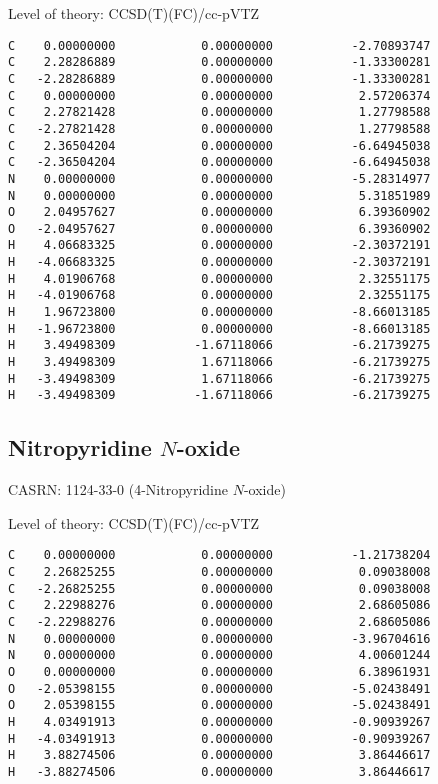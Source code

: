\documentclass[journal=jctcce,manuscript=article,layout=traditional]{achemso}
\newcommand{\TZ}{cc-pVTZ}
\begin{document}
\begin{singlespace}
\noindent    Level of theory: CCSD(T)(FC)/{\TZ}
\begin{verbatim}
C    0.00000000            0.00000000           -2.70893747
C    2.28286889            0.00000000           -1.33300281
C   -2.28286889            0.00000000           -1.33300281
C    0.00000000            0.00000000            2.57206374
C    2.27821428            0.00000000            1.27798588
C   -2.27821428            0.00000000            1.27798588
C    2.36504204            0.00000000           -6.64945038
C   -2.36504204            0.00000000           -6.64945038
N    0.00000000            0.00000000           -5.28314977
N    0.00000000            0.00000000            5.31851989
O    2.04957627            0.00000000            6.39360902
O   -2.04957627            0.00000000            6.39360902
H    4.06683325            0.00000000           -2.30372191
H   -4.06683325            0.00000000           -2.30372191
H    4.01906768            0.00000000            2.32551175
H   -4.01906768            0.00000000            2.32551175
H    1.96723800            0.00000000           -8.66013185
H   -1.96723800            0.00000000           -8.66013185
H    3.49498309           -1.67118066           -6.21739275
H    3.49498309            1.67118066           -6.21739275
H   -3.49498309            1.67118066           -6.21739275
H   -3.49498309           -1.67118066           -6.21739275
\end{verbatim}
\end{singlespace}

\subsection{Nitropyridine $N$-oxide}

CASRN: 1124-33-0 (4-Nitropyridine $N$-oxide)

\begin{singlespace}
\noindent   Level of theory: CCSD(T)(FC)/{\TZ}
\begin{verbatim}
C    0.00000000            0.00000000           -1.21738204
C    2.26825255            0.00000000            0.09038008
C   -2.26825255            0.00000000            0.09038008
C    2.22988276            0.00000000            2.68605086
C   -2.22988276            0.00000000            2.68605086
N    0.00000000            0.00000000           -3.96704616
N    0.00000000            0.00000000            4.00601244
O    0.00000000            0.00000000            6.38961931
O   -2.05398155            0.00000000           -5.02438491
O    2.05398155            0.00000000           -5.02438491
H    4.03491913            0.00000000           -0.90939267
H   -4.03491913            0.00000000           -0.90939267
H    3.88274506            0.00000000            3.86446617
H   -3.88274506            0.00000000            3.86446617
\end{verbatim}
\end{singlespace}
\end{document}
